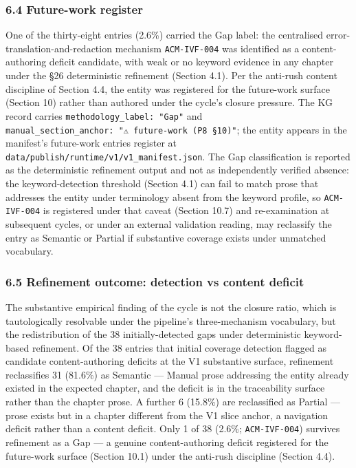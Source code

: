 \documentclass[
]{article}
\begin{document}
\subsubsection{6.4 Future-work register}\label{future-work-register}

One of the thirty-eight entries (2.6\%) carried the Gap label: the
centralised error-translation-and-redaction mechanism
\texttt{ACM-IVF-004} was identified as a content-authoring deficit
candidate, with weak or no keyword evidence in any chapter under the §26
deterministic refinement (Section 4.1). Per the anti-rush content
discipline of Section 4.4, the entity was registered for the future-work
surface (Section 10) rather than authored under the cycle's closure
pressure. The KG record carries \texttt{methodology\_label:\ "Gap"} and
\texttt{manual\_section\_anchor:\ "⚠️\ future-work\ (P8\ §10)"}; the
entity appears in the manifest's future-work entries register at
\texttt{data/publish/runtime/v1/v1\_manifest.json}. The Gap
classification is reported as the deterministic refinement output and
not as independently verified absence: the keyword-detection threshold
(Section 4.1) can fail to match prose that addresses the entity under
terminology absent from the keyword profile, so \texttt{ACM-IVF-004} is
registered under that caveat (Section 10.7) and re-examination at
subsequent cycles, or under an external validation reading, may
reclassify the entry as Semantic or Partial if substantive coverage
exists under unmatched vocabulary.

\subsubsection{6.5 Refinement outcome: detection vs content
deficit}\label{refinement-outcome-detection-vs-content-deficit}

The substantive empirical finding of the cycle is not the closure ratio,
which is tautologically resolvable under the pipeline's three-mechanism
vocabulary, but the redistribution of the 38 initially-detected gaps
under deterministic keyword-based refinement. Of the 38 entries that
initial coverage detection flagged as candidate content-authoring
deficits at the V1 substantive surface, refinement reclassifies 31
(81.6\%) as Semantic --- Manual prose addressing the entity already
existed in the expected chapter, and the deficit is in the traceability
surface rather than the chapter prose. A further 6 (15.8\%) are
reclassified as Partial --- prose exists but in a chapter different from
the V1 slice anchor, a navigation deficit rather than a content deficit.
Only 1 of 38 (2.6\%; \texttt{ACM-IVF-004}) survives refinement as a Gap
--- a genuine content-authoring deficit registered for the future-work
surface (Section 10.1) under the anti-rush discipline (Section 4.4).
\end{document}
